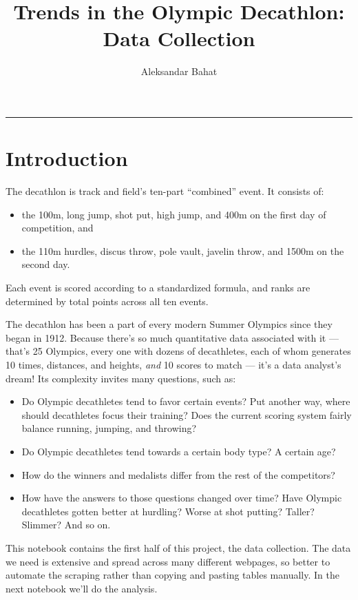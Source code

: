 \documentclass[11pt]{article}
\title{\vspace{-0.3in}Trends in the Olympic Decathlon: Data Collection\vspace{-0.1in}}
\author{Aleksandar Bahat}
\date{\vspace{-0.3in}}
\begin{document}
    
    \maketitle
    

\begin{center}\rule{\linewidth}{0.5pt}\end{center}

    \hypertarget{introduction}{%
\section*{Introduction}\label{introduction}}

    The decathlon is track and field's ten-part ``combined'' event. It
consists of:
\begin{itemize}
\item the 100m, long jump, shot put, high jump, and 400m on the
first day of competition, and
\item the 110m hurdles, discus throw, pole
vault, javelin throw, and 1500m on the second day.
\end{itemize}

    Each event is scored according to a standardized formula, and ranks are
determined by total points across all ten events.

    The decathlon has been a part of every modern Summer Olympics since they
began in 1912. Because there's so much quantitative data associated with
it --- that's 25 Olympics, every one with dozens of decathletes, each of
whom generates 10 times, distances, and heights, \emph{and} 10 scores to
match --- it's a data analyst's dream! Its complexity invites many
questions, such as:
\begin{itemize}
\item Do Olympic decathletes tend to favor certain
events? Put another way, where should decathletes focus their training?
Does the current scoring system fairly balance running, jumping, and
throwing?
\item Do Olympic decathletes tend towards a certain body type? A
certain age?
\item How do the winners and medalists differ from the rest of
the competitors?
\item How have the answers to those questions changed over
time? Have Olympic decathletes gotten better at hurdling? Worse at shot
putting? Taller? Slimmer? And so on.
\end{itemize}

    This notebook contains the first half of this project, the data
collection. The data we need is extensive and spread across many
different webpages, so better to automate the scraping rather than
copying and pasting tables manually. In the next notebook we'll do the
analysis.
\end{document}
